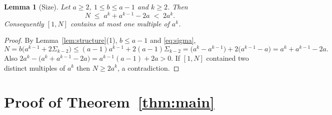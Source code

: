 \documentclass{amsart}
\newtheorem{lemma}[theorem]{Lemma}
\theoremstyle{definition}
\begin{document}
\begin{lemma}[Size]\label{lem:size}
Let $a\ge2$, $1\le b\le a-1$ and $k\ge2$.  Then
\[
  N\;\le\;a^{k}+a^{k-1}-2a\;<\;2a^{k} .
\]
Consequently $[1,N]$ contains at most one multiple of $a^{k}$.
\end{lemma}

\begin{proof}
By Lemma~\ref{lem:structure}(1), $b\le a-1$ and \eqref{eq:sigma},
\[
  N=b\bigl(a^{k-1}+2\Sigma_{k-2}\bigr)
   \le (a-1)a^{k-1}+2(a-1)\Sigma_{k-2}
   = \bigl(a^{k}-a^{k-1}\bigr)+2\bigl(a^{k-1}-a\bigr)
   = a^{k}+a^{k-1}-2a .
\]
Also $2a^{k}-\bigl(a^{k}+a^{k-1}-2a\bigr)=a^{k-1}(a-1)+2a>0$.  If $[1,N]$
contained two distinct multiples of $a^{k}$ then $N\ge 2a^{k}$, a
contradiction.
\end{proof}

\section{Proof of Theorem~\ref{thm:main}}
\end{document}
